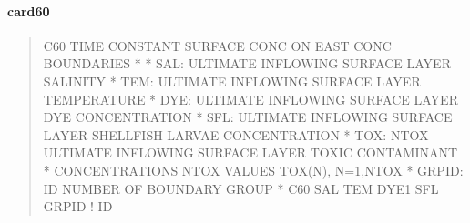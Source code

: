 \documentclass[letterpaper,10pt,english]{sphinxmanual}
\begin{document}
\paragraph{card60}
\label{\detokenize{inputfiles/runcontrol/card60:card60}}\label{\detokenize{inputfiles/runcontrol/card60::doc}}\begin{quote}

\begin{sphinxVerbatim}[commandchars=\\\{\}]
\PYGZhy{}\PYGZhy{}\PYGZhy{}\PYGZhy{}\PYGZhy{}\PYGZhy{}\PYGZhy{}\PYGZhy{}\PYGZhy{}\PYGZhy{}\PYGZhy{}\PYGZhy{}\PYGZhy{}\PYGZhy{}\PYGZhy{}\PYGZhy{}\PYGZhy{}\PYGZhy{}\PYGZhy{}\PYGZhy{}\PYGZhy{}\PYGZhy{}\PYGZhy{}\PYGZhy{}\PYGZhy{}\PYGZhy{}\PYGZhy{}\PYGZhy{}\PYGZhy{}\PYGZhy{}\PYGZhy{}\PYGZhy{}\PYGZhy{}\PYGZhy{}\PYGZhy{}\PYGZhy{}\PYGZhy{}\PYGZhy{}\PYGZhy{}\PYGZhy{}\PYGZhy{}\PYGZhy{}\PYGZhy{}\PYGZhy{}\PYGZhy{}\PYGZhy{}\PYGZhy{}\PYGZhy{}\PYGZhy{}\PYGZhy{}\PYGZhy{}\PYGZhy{}\PYGZhy{}\PYGZhy{}\PYGZhy{}\PYGZhy{}\PYGZhy{}\PYGZhy{}\PYGZhy{}\PYGZhy{}\PYGZhy{}\PYGZhy{}\PYGZhy{}\PYGZhy{}\PYGZhy{}\PYGZhy{}\PYGZhy{}\PYGZhy{}\PYGZhy{}\PYGZhy{}\PYGZhy{}\PYGZhy{}\PYGZhy{}\PYGZhy{}\PYGZhy{}\PYGZhy{}\PYGZhy{}\PYGZhy{}
C60 TIME CONSTANT SURFACE CONC ON EAST CONC BOUNDARIES
*
*    SAL: ULTIMATE INFLOWING SURFACE LAYER SALINITY
*    TEM: ULTIMATE INFLOWING SURFACE LAYER TEMPERATURE
*    DYE: ULTIMATE INFLOWING SURFACE LAYER DYE CONCENTRATION
*    SFL: ULTIMATE INFLOWING SURFACE LAYER SHELLFISH LARVAE CONCENTRATION
*    TOX: NTOX ULTIMATE INFLOWING SURFACE LAYER TOXIC CONTAMINANT
*         CONCENTRATIONS NTOX VALUES TOX(N), N=1,NTOX
*  GRPID: ID NUMBER OF BOUNDARY GROUP
*
C60       SAL       TEM      DYE1       SFL      GRPID ! ID
\end{sphinxVerbatim}
\end{quote}
\end{document}
